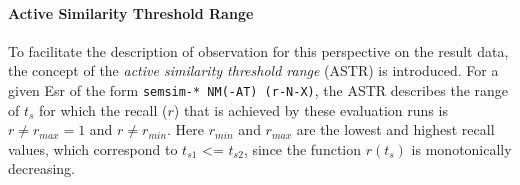 \documentclass[11pt]{scrreprt}
\begin{document}
{%

\paragraph{Active Similarity Threshold Range}
To facilitate the description of observation for this perspective on the result data, the concept of the \textit{active similarity threshold range} (ASTR) is introduced. For a given E\gls{sr} of the form \texttt{semsim-* NM(-AT) (r-N-X)}, the ASTR describes the range of \(t_s\) for which the recall (\(r\)) that is achieved by these evaluation runs is \(r \neq r_{max} = 1 \) and \(r \neq r_{min}\). Here \(r_{min}\) and \(r_{max}\) are the lowest and highest recall values, which correspond to \(t_{s1}\) <= \(t_{s2}\), since the function \(r(t_s)\) is monotonically decreasing.


}
\end{document}
